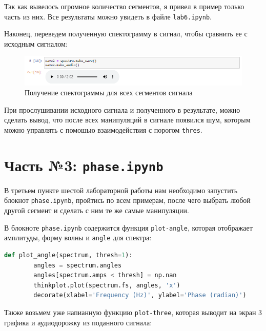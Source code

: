 \documentclass[a4paper]{article}
\begin{document}
            Так как вывелось огромное количество сегментов, я привел в пример только часть из них. Все результаты можно увидеть в файле \texttt{lab6.ipynb}. 
            
            Наконец, переведем полученную спектограмму в сигнал, чтобы сравнить ее с исходным сигналом:
            
            \begin{figure}[H]
                \centering
                \includegraphics[width=\textwidth]{ex_2_result_audio.png}
                \caption{Получение спектограммы для всех сегментов сигнала}
                \label{fig:ex_2_result_audio}
            \end{figure}
            
            При прослушивании исходного сигнала и полученного в результате, можно сделать вывод, что после всех манипуляций в сигнале появился шум, которым можно управлять с помошью взаимодействия с порогом \texttt{thres}.
            
    \newpage
        \section{Часть №3: \texttt{phase.ipynb}}
            В третьем пункте шестой лабораторной работы нам необходимо запустить блокнот \texttt{phase.ipynb}, пройтись по всем примерам, после чего выбрать любой другой сегмент и сделать с ним те же самые манипуляции.
            
            В блокноте \texttt{phase.ipynb} содержится функция \texttt{plot-angle}, которая отображает амплитуды, форму волны и \texttt{angle} для спектра:
            
\begin{lstlisting}[language=Python, caption= Функция \texttt{plot-angle}]
    def plot_angle(spectrum, thresh=1):
        angles = spectrum.angles
        angles[spectrum.amps < thresh] = np.nan
        thinkplot.plot(spectrum.fs, angles, 'x')
        decorate(xlabel='Frequency (Hz)', ylabel='Phase (radian)')
\end{lstlisting} 
            
            Также возьмем уже напианную функцию \texttt{plot-three}, которая выводит на экран 3 графика и аудиодорожку из поданного сигнала:
            
\end{document}
